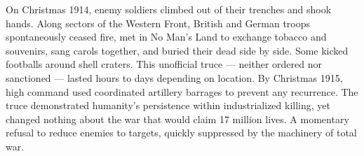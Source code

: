 On Christmas 1914, enemy soldiers climbed out of their trenches and shook hands. Along sectors of the Western Front, British and German troops spontaneously ceased fire, met in No Man's Land to exchange tobacco and souvenirs, sang carols together, and buried their dead side by side. Some kicked footballs around shell craters. This unofficial truce — neither ordered nor sanctioned — lasted hours to days depending on location. By Christmas 1915, high command used coordinated artillery barrages to prevent any recurrence. The truce demonstrated humanity's persistence within industrialized killing, yet changed nothing about the war that would claim 17 million lives. A momentary refusal to reduce enemies to targets, quickly suppressed by the machinery of total war.
